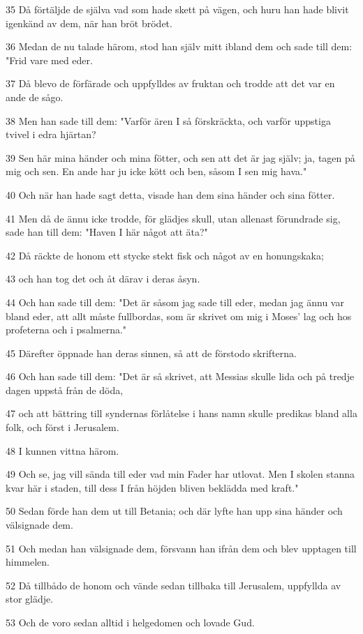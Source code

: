 \par 35 Då förtäljde de själva vad som hade skett på vägen, och huru han hade blivit igenkänd av dem, när han bröt brödet.
\par 36 Medan de nu talade härom, stod han själv mitt ibland dem och sade till dem: "Frid vare med eder.
\par 37 Då blevo de förfärade och uppfylldes av fruktan och trodde att det var en ande de sågo.
\par 38 Men han sade till dem: "Varför ären I så förskräckta, och varför uppstiga tvivel i edra hjärtan?
\par 39 Sen här mina händer och mina fötter, och sen att det är jag själv; ja, tagen på mig och sen. En ande har ju icke kött och ben, såsom I sen mig hava."
\par 40 Och när han hade sagt detta, visade han dem sina händer och sina fötter.
\par 41 Men då de ännu icke trodde, för glädjes skull, utan allenast förundrade sig, sade han till dem: "Haven I här något att äta?"
\par 42 Då räckte de honom ett stycke stekt fisk och något av en honungskaka;
\par 43 och han tog det och åt därav i deras åsyn.
\par 44 Och han sade till dem: "Det är såsom jag sade till eder, medan jag ännu var bland eder, att allt måste fullbordas, som är skrivet om mig i Moses' lag och hos profeterna och i psalmerna."
\par 45 Därefter öppnade han deras sinnen, så att de förstodo skrifterna.
\par 46 Och han sade till dem: "Det är så skrivet, att Messias skulle lida och på tredje dagen uppstå från de döda,
\par 47 och att bättring till syndernas förlåtelse i hans namn skulle predikas bland alla folk, och först i Jerusalem.
\par 48 I kunnen vittna härom.
\par 49 Och se, jag vill sända till eder vad min Fader har utlovat. Men I skolen stanna kvar här i staden, till dess I från höjden bliven beklädda med kraft."
\par 50 Sedan förde han dem ut till Betania; och där lyfte han upp sina händer och välsignade dem.
\par 51 Och medan han välsignade dem, försvann han ifrån dem och blev upptagen till himmelen.
\par 52 Då tillbådo de honom och vände sedan tillbaka till Jerusalem, uppfyllda av stor glädje.
\par 53 Och de voro sedan alltid i helgedomen och lovade Gud.


